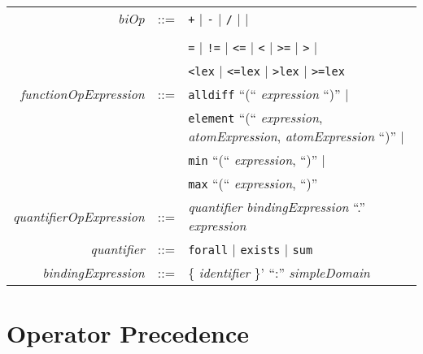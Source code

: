 \documentclass{article}
\begin{document}
\begin{tabular}{rcl}
\textit{biOp} & ::= & {\tt +} $\mid$ {\tt -}  $\mid$ {\tt /}  $\mid$ {\tt *}  $\mid$  \verb1^1  $\mid$ \\
              &     &  \verb1\/1  $\mid$ \verb1/\1  $\mid$ {\tt =>}  $\mid$ {\tt <=>}  $\mid$ \\
              &     & {\tt =}  $\mid$ {\tt !=}  $\mid$ {\tt <=}  $\mid$ {\tt <}  $\mid$ {\tt >=}  $\mid$ {\tt >} $\mid$ \\
              &     & {\tt <lex} $\mid$ {\tt <=lex} $\mid$ {\tt >lex} $\mid$ {\tt >=lex} \\
\textit{functionOpExpression} & ::= & \texttt{alldiff} ``(`` \textit{expression} ``)'' $\mid$ \\
                              &     & \texttt{element} ``(``
                              \textit{expression},
                               \textit{atomExpression},
                              \textit{atomExpression} ``)''  $\mid$\\  
                                &     & \texttt{min} ``(``
                              \textit{expression},
                            ``)'' $\mid$ \\  
                                 &     & \texttt{max} ``(``
                              \textit{expression},
                            ``)'' \\  

 \textit{quantifierOpExpression} & ::= & \textit{quantifier} \textit{bindingExpression} ``.'' \textit{expression} \\
\textit{quantifier} & ::= & \texttt{forall} $\mid$ \texttt{exists} $\mid$ \texttt{sum} \\ 
\textit{bindingExpression} & ::= & \{ \textit{identifier} \}' ``:'' \textit{simpleDomain} \\




\end{tabular}

\section{Operator Precedence}
\end{document}
